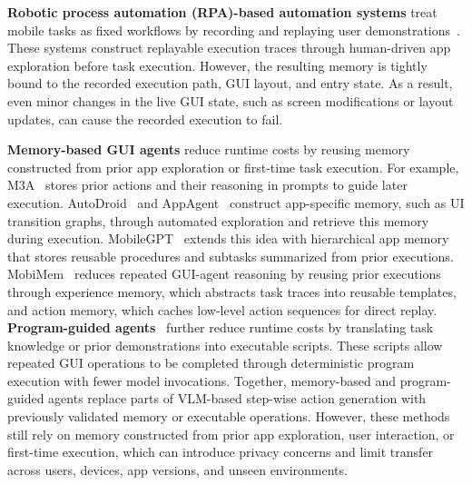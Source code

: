 \textbf{Robotic process automation (RPA)-based automation systems} treat mobile tasks as fixed workflows by recording and replaying user demonstrations~\cite{li2017sugilite,gomez2013reran,maestro2026,openatx_uiautomator2_2026}.
These systems construct replayable execution traces through human-driven app exploration before task execution.
However, the resulting memory is tightly bound to the recorded execution path, GUI layout, and entry state.
As a result, even minor changes in the live GUI state, such as screen modifications or layout updates, can cause the recorded execution to fail.

\textbf{Memory-based GUI agents} reduce runtime costs by reusing memory constructed from prior app exploration or first-time task execution.
For example, M3A~\cite{rawles2025androidworld} stores prior actions and their reasoning in prompts to guide later execution.
AutoDroid~\cite{wen2024autodroid} and AppAgent~\cite{zhang2025appagent} construct app-specific memory, such as UI transition graphs, through automated exploration and retrieve this memory during execution.
MobileGPT~\cite{lee2024mobilegpt} extends this idea with hierarchical app memory that stores reusable procedures and subtasks summarized from prior executions.
MobiMem~\cite{liu2025beyond} reduces repeated GUI-agent reasoning by reusing prior executions through experience memory, which abstracts task traces into reusable templates, and action memory, which caches low-level action sequences for direct replay.
\textbf{Program-guided agents}~\cite{autodroid-v2,zhong2026actionengine,wang2026imperative,tian2025agentprog} further reduce runtime costs by translating task knowledge or prior demonstrations into executable scripts.
These scripts allow repeated GUI operations to be completed through deterministic program execution with fewer model invocations.
Together, memory-based and program-guided agents replace parts of VLM-based step-wise action generation with previously validated memory or executable operations.
However, these methods still rely on memory constructed from prior app exploration, user interaction, or first-time execution, which can introduce privacy concerns and limit transfer across users, devices, app versions, and unseen environments.


